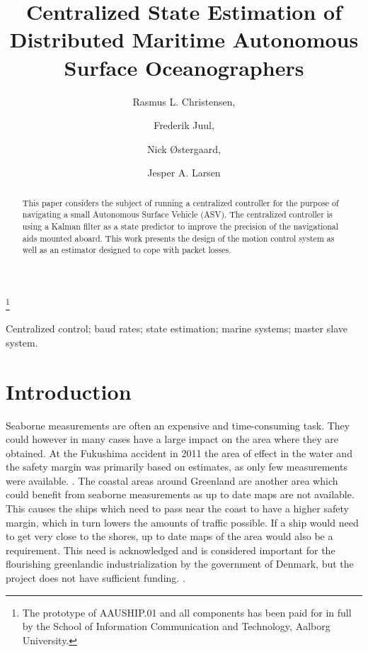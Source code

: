 \documentclass[journal]{IEEEtran}
\begin{document}
\begin{frontmatter}

\title{Centralized State Estimation of Distributed Maritime Autonomous Surface Oceanographers} %

\thanks[footnoteinfo]{The prototype of AAUSHIP.01 and all components has been paid for in full by the School of Information Communication and Technology, Aalborg University.}

\author{Rasmus L. Christensen,} 
\author{Frederik Juul,} 
\author{Nick \O stergaard,}
\author{Jesper A. Larsen}
\address{Section of Automation and Control, Department of Electronic Systems, Aalborg University, Fredrik Bajers Vej 7, 9220 Aalborg \O st, Denmark (e-mail: \{ralch,nickoe,fjuul,jal\}@es.aau.dk)}                                            
          
\begin{keyword}                           %
Centralized control; baud rates; state estimation; marine systems; master slave system.              %
\end{keyword}                             %


\begin{abstract}                          %
This paper considers the subject of running a centralized controller for the purpose of navigating a small Autonomous Surface Vehicle (ASV). The centralized controller is using a Kalman filter as a state predictor to improve the precision of the navigational aids mounted aboard. This work presents the design of the motion control system as well as an estimator designed to cope with packet losses. 
\end{abstract}

\end{frontmatter}

\section{Introduction}
Seaborne measurements are often an expensive and time-consuming task. They could however in many cases have a large impact on the area where they are obtained. At the Fukushima accident in 2011 the area of effect in the water and the safety margin was primarily based on estimates, as only few measurements were available. \cite{energy}.
The coastal areas around Greenland are another area which could benefit from seaborne measurements as up to date maps are not available. This causes the ships which need to pass near the coast to have a higher safety margin, which in turn lowers the amounts of traffic possible. If a ship would need to get very close to the shores, up to date maps of the area would also be a requirement. This need is acknowledged and is considered important for the flourishing greenlandic industrialization by the government of Denmark, but the project does not have sufficient funding. \cite{engineer}.
\end{document}
